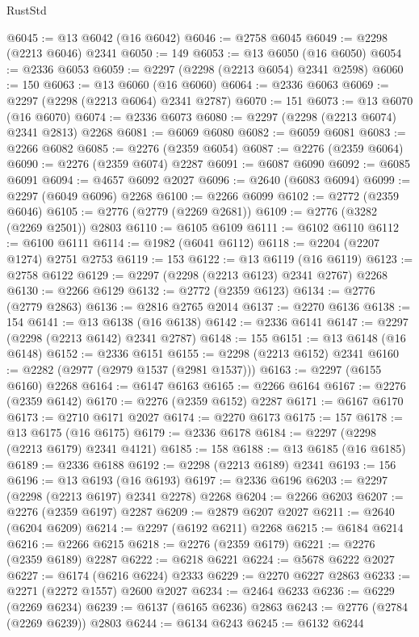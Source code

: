 \begin{lexlean}{RustStd}
\begin{coremodule}
{\begin{coremodule}
{{{{{{{{{{{{{{{{{{{{{{{{{{{{{{{{{{{{{{{{{{{{{{{{{{{{{{@6045 := @13 @6042 (@16 @6042)
@6046 := @2758 @6045
@6049 := @2298 (@2213 @6046) @2341
@6050 := 149
@6053 := @13 @6050 (@16 @6050)
@6054 := @2336 @6053
@6059 := @2297 (@2298 (@2213 @6054) @2341 @2598)
@6060 := 150
@6063 := @13 @6060 (@16 @6060)
@6064 := @2336 @6063
@6069 := @2297 (@2298 (@2213 @6064) @2341 @2787)
@6070 := 151
@6073 := @13 @6070 (@16 @6070)
@6074 := @2336 @6073
@6080 := @2297 (@2298 (@2213 @6074) @2341 @2813) @2268
@6081 := @6069 @6080
@6082 := @6059 @6081
@6083 := @2266 @6082
@6085 := @2276 (@2359 @6054)
@6087 := @2276 (@2359 @6064)
@6090 := @2276 (@2359 @6074) @2287
@6091 := @6087 @6090
@6092 := @6085 @6091
@6094 := @4657 @6092 @2027
@6096 := @2640 (@6083 @6094)
@6099 := @2297 (@6049 @6096) @2268
@6100 := @2266 @6099
@6102 := @2772 (@2359 @6046)
@6105 := @2776 (@2779 (@2269 @2681))
@6109 := @2776 (@3282 (@2269 @2501)) @2803
@6110 := @6105 @6109
@6111 := @6102 @6110
@6112 := @6100 @6111
@6114 := @1982 (@6041 @6112)
@6118 := @2204 (@2207 @1274) @2751 @2753
@6119 := 153
@6122 := @13 @6119 (@16 @6119)
@6123 := @2758 @6122
@6129 := @2297 (@2298 (@2213 @6123) @2341 @2767) @2268
@6130 := @2266 @6129
@6132 := @2772 (@2359 @6123)
@6134 := @2776 (@2779 @2863)
@6136 := @2816 @2765 @2014
@6137 := @2270 @6136
@6138 := 154
@6141 := @13 @6138 (@16 @6138)
@6142 := @2336 @6141
@6147 := @2297 (@2298 (@2213 @6142) @2341 @2787)
@6148 := 155
@6151 := @13 @6148 (@16 @6148)
@6152 := @2336 @6151
@6155 := @2298 (@2213 @6152) @2341
@6160 := @2282 (@2977 (@2979 @1537 (@2981 @1537)))
@6163 := @2297 (@6155 @6160) @2268
@6164 := @6147 @6163
@6165 := @2266 @6164
@6167 := @2276 (@2359 @6142)
@6170 := @2276 (@2359 @6152) @2287
@6171 := @6167 @6170
@6173 := @2710 @6171 @2027
@6174 := @2270 @6173
@6175 := 157
@6178 := @13 @6175 (@16 @6175)
@6179 := @2336 @6178
@6184 := @2297 (@2298 (@2213 @6179) @2341 @4121)
@6185 := 158
@6188 := @13 @6185 (@16 @6185)
@6189 := @2336 @6188
@6192 := @2298 (@2213 @6189) @2341
@6193 := 156
@6196 := @13 @6193 (@16 @6193)
@6197 := @2336 @6196
@6203 := @2297 (@2298 (@2213 @6197) @2341 @2278) @2268
@6204 := @2266 @6203
@6207 := @2276 (@2359 @6197) @2287
@6209 := @2879 @6207 @2027
@6211 := @2640 (@6204 @6209)
@6214 := @2297 (@6192 @6211) @2268
@6215 := @6184 @6214
@6216 := @2266 @6215
@6218 := @2276 (@2359 @6179)
@6221 := @2276 (@2359 @6189) @2287
@6222 := @6218 @6221
@6224 := @5678 @6222 @2027
@6227 := @6174 (@6216 @6224) @2333
@6229 := @2270 @6227 @2863
@6233 := @2271 (@2272 @1557) @2600 @2027
@6234 := @2464 @6233
@6236 := @6229 (@2269 @6234)
@6239 := @6137 (@6165 @6236) @2863
@6243 := @2776 (@2784 (@2269 @6239)) @2803
@6244 := @6134 @6243
@6245 := @6132 @6244
}}}}}}}}}}}}}}}}}}}}}}}}}}}}}}}}}}}}}}}}}}}}}}}}}}}}}}
\end{coremodule}}
\end{coremodule}
\end{lexlean}
